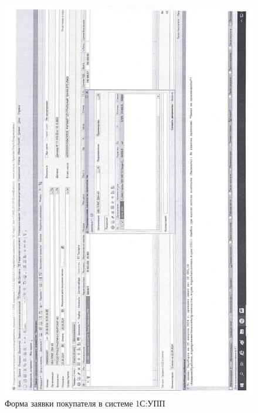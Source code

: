 \begin{figure}
\begin{center}
 \includegraphics[height=0.8\textheight, keepaspectratio]{Pics/d11.jpg}
\end{center}
 \caption{Форма заявки покупателя в системе 1С:УПП}
 \label{pic:d11}
\end{figure}

